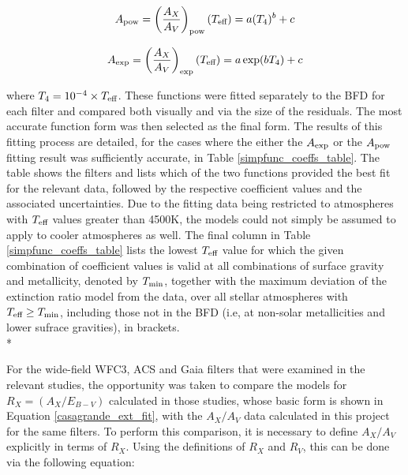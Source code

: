 \documentclass[12pt, a4paper]{report}
\begin{document}
\begin{equation}
A_{\textnormal{pow}} = \left(\frac{A_{X}}{A_{V}}\right)_{\textnormal{pow}}(T_{\textnormal{eff}}) = a (T_{4})^{b} + c
\label{Teff_pow}
\end{equation}

\begin{equation}
A_{\textnormal{exp}} = \left(\frac{A_{X}}{A_{V}}\right)_{\textnormal{exp}} (T_{\textnormal{eff}}) = a \exp(b T_{4}) + c
\label{Teff_exp}
\end{equation}

where $T_{4} = 10^{-4} \times T_{\textnormal{eff}}$. These functions were fitted separately to the BFD for each filter and compared both visually and via the size of the residuals. The most accurate function form was then selected as the final form. The results of this fitting process are detailed, for the cases where the either the $A_{\textnormal{exp}}$ or the $A_{\textnormal{pow}}$ fitting result was sufficiently accurate, in Table \ref{simpfunc_coeffs_table}. The table shows the filters and lists which of the two functions provided the best fit for the relevant data, followed by the respective coefficient values and the associated uncertainties. Due to the fitting data being restricted to atmospheres with $T_{\textnormal{eff}}$ values greater than 4500K, the models could not simply be assumed to apply to cooler atmospheres as well. The final column in Table \ref{simpfunc_coeffs_table} lists the lowest $T_{\textnormal{eff}}$ value for which the given combination of coefficient values is valid at all combinations of surface gravity and metallicity, denoted by $T_{\textnormal{min}}$, together with the maximum deviation of the extinction ratio model from the data, over all stellar atmospheres with $T_{\textnormal{eff}} \geq T_{\textnormal{min}}$, including those not in the BFD (i.e, at non-solar metallicities and lower sufrace gravities), in brackets. \\*

For the wide-field WFC3, ACS \citep{2014MNRAS.444..392C} and Gaia \citep{2018MNRAS.479L.102C} filters that were examined in the relevant studies, the opportunity was taken to compare the models for $R_{X} = (A_{X}/E_{B-V})$ calculated in those studies, whose basic form is shown in Equation \ref{casagrande_ext_fit}, with the $A_{X}/A_{V}$ data calculated in this project for the same filters. To perform this comparison, it is necessary to define $A_{X}/A_{V}$ explicitly in terms of $R_{X}$. Using the definitions of $R_{X}$ and $R_{V}$, this can be done via the following equation:
\end{document}
